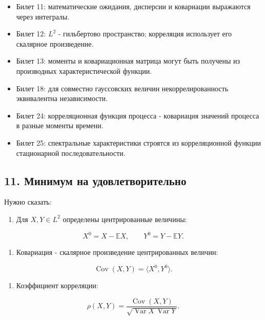 \documentclass[
  11pt,
  a4paper,
]{article}
\providecommand{\tightlist}{%
  \setlength{\itemsep}{0pt}\setlength{\parskip}{0pt}}
\begin{document}
\begin{itemize}
\tightlist
\item
  Билет 11: математические ожидания, дисперсии и ковариации выражаются
  через интегралы.
\item
  Билет 12: \(L^2\) - гильбертово пространство; корреляция использует
  его скалярное произведение.
\item
  Билет 13: моменты и ковариационная матрица могут быть получены из
  производных характеристической функции.
\item
  Билет 18: для совместно гауссовских величин некоррелированность
  эквивалентна независимости.
\item
  Билет 24: корреляционная функция процесса - ковариация значений
  процесса в разные моменты времени.
\item
  Билет 25: спектральные характеристики строятся из корреляционной
  функции стационарной последовательности.
\end{itemize}

\subsection{11. Минимум на
удовлетворительно}\label{ux43cux438ux43dux438ux43cux443ux43c-ux43dux430-ux443ux434ux43eux432ux43bux435ux442ux432ux43eux440ux438ux442ux435ux43bux44cux43dux43e}

Нужно сказать:

\begin{enumerate}
\def\labelenumi{\arabic{enumi}.}
\tightlist
\item
  Для \(X,Y\in L^2\) определены центрированные величины:
\end{enumerate}

\[
X^0=X-\mathbb EX,
\qquad
Y^0=Y-\mathbb EY.
\]

\begin{enumerate}
\def\labelenumi{\arabic{enumi}.}
\setcounter{enumi}{1}
\tightlist
\item
  Ковариация - скалярное произведение центрированных величин:
\end{enumerate}

\[
\operatorname{Cov}(X,Y)=\langle X^0,Y^0\rangle.
\]

\begin{enumerate}
\def\labelenumi{\arabic{enumi}.}
\setcounter{enumi}{2}
\tightlist
\item
  Коэффициент корреляции:
\end{enumerate}

\[
\rho(X,Y)=
\frac{\operatorname{Cov}(X,Y)}
{\sqrt{\operatorname{Var}X\,\operatorname{Var}Y}}.
\]
\end{document}

